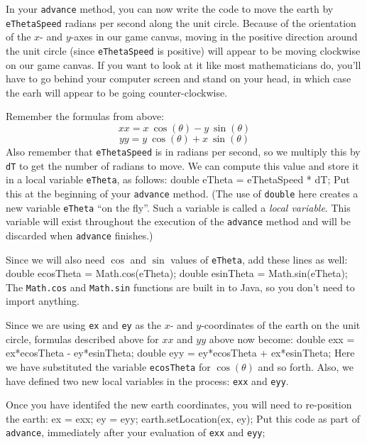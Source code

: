 \documentclass[11pt]{article}
\newenvironment{qv}%
  {\quote
   \verbatim}%
  {\endverbatim
   \endquote}
\begin{document}
In your {\tt advance} method,
you can now write the code to move the earth
by \verb'eThetaSpeed' radians per second along the unit circle.
Because of the orientation of the $x$- and $y$-axes in our game canvas,
moving in the positive direction around the unit circle
(since \verb'eThetaSpeed' is positive) will appear
to be moving clockwise on our game canvas.
If you want to look at it like most mathematicians do,
you'll have to go behind your computer screen and stand on your head,
in which case the earh will appear to be going counter-clockwise.

Remember the formulas from above:
\[xx =
  x\:\cos(\theta) -
  y\:\sin(\theta)\]
\[yy =
  y\:\cos(\theta) +
  x\:\sin(\theta)\]
Also remember that \verb'eThetaSpeed' is in radians per second,
so we multiply this by \verb'dT'
to get the number of radians to move.
We can compute this value and store it in a local variable
\verb'eTheta', as follows:
\begin{qv}
double eTheta = eThetaSpeed * dT;
\end{qv}
Put this at the beginning of your \verb'advance' method.
(The use of {\tt double} here creates
a new variable \verb'eTheta' ``on the fly''.
Such a variable is called a {\em local variable}.
This variable will exist throughout the execution of the {\tt advance} method
and will be discarded when {\tt advance} finishes.)

Since we will also need $\cos$ and $\sin$ values of \verb'eTheta',
add these lines as well:
\begin{qv}
double ecosTheta = Math.cos(eTheta);
double esinTheta = Math.sin(eTheta);
\end{qv}
The \verb'Math.cos' and \verb'Math.sin' functions
are built in to Java, so you don't need to import anything. 

Since we are using {\tt ex} and {\tt ey} as the $x$- and $y$-coordinates
of the earth on the unit circle,
formulas described above for $xx$ and $yy$ above now become:
\begin{qv}
double exx = ex*ecosTheta - ey*esinTheta;
double eyy = ey*ecosTheta + ex*esinTheta;
\end{qv}
Here we have substituted the variable {\tt ecosTheta} for $\cos(\theta)$
and so forth.
Also, we have defined two new local variables in the process:
{\tt exx} and {\tt eyy}.

Once you have identifed the new earth coordinates,
you will need to re-position the earth:
\begin{qv}
ex = exx;
ey = eyy;
earth.setLocation(ex, ey);
\end{qv}
Put this code as part of {\tt advance},
immediately after your evaluation of {\tt exx} and {\tt eyy};
\end{document}
